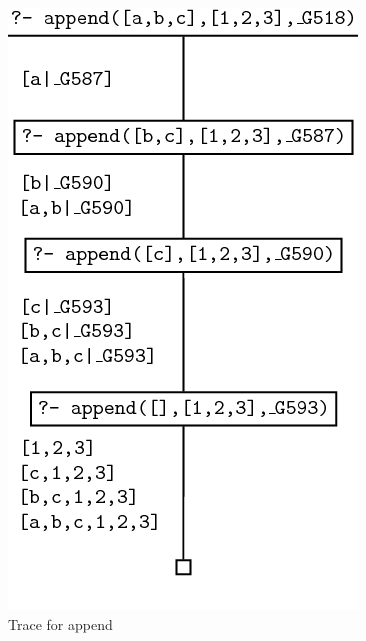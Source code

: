 \documentclass[thesis-solanki.tex]{subfiles}
\begin{document}
\begin{figure}[H]
\centering
\includegraphics[scale = 0.5]{PrologAppendWorking.png}
\caption{Trace for append \cite{webiste:learnprolognowappend}}
\label{fig:Trace for append}
\end{figure}
\end{document}
